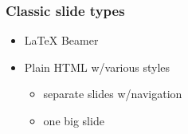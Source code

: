 \documentclass{beamer}
\begin{document}
\begin{frame}
\frametitle{Classic slide types}

\begin{itemize}
 \item {\LaTeX} Beamer

 \item Plain HTML w/various styles
\begin{itemize}

   \item separate slides w/navigation

   \item one big slide
\end{itemize}

\noindent
\end{itemize}

\noindent
\end{frame}
\end{document}

